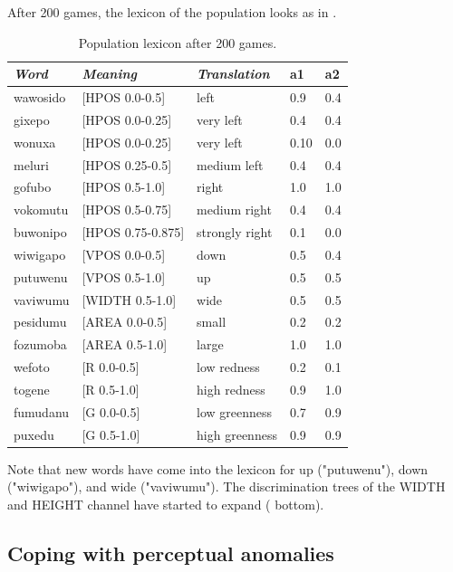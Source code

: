 After 200 games, the lexicon of the population looks as in . 
\begin{table}
\begin{center}
\begin{tabular}{| l | l | l | l | l |} \hline
{\it Word}&{\it Meaning}&{\it Translation} & {\bf a1}&{\bf a2} \\ \hline
wawosido & [HPOS 0.0-0.5] &left&0.9&0.4\\ \hline
gixepo & [HPOS 0.0-0.25] & very left&0.4&0.4\\ \hline
wonuxa & [HPOS 0.0-0.25] & very left&0.10&0.0\\ \hline
meluri & [HPOS 0.25-0.5] &medium left&0.4&0.4\\ \hline
gofubo & [HPOS 0.5-1.0]& right&1.0&1.0\\ \hline
vokomutu & [HPOS 0.5-0.75] &medium right&0.4&0.4\\ \hline
buwonipo & [HPOS 0.75-0.875] &strongly right&0.1&0.0\\ \hline
wiwigapo & [VPOS 0.0-0.5] &down&0.5&0.4\\ \hline
putuwenu & [VPOS 0.5-1.0]&up & 0.5&0.5\\ \hline
vaviwumu & [WIDTH 0.5-1.0]&wide & 0.5&0.5\\ \hline
pesidumu & [AREA 0.0-0.5]&small& 0.2&0.2\\ \hline
fozumoba & [AREA 0.5-1.0]&large & 1.0&1.0\\ \hline
wefoto & [R 0.0-0.5]& low redness &0.2&0.1\\ \hline
togene & [R 0.5-1.0]& high redness &0.9&1.0\\ \hline
fumudanu & [G 0.0-0.5]& low greenness &0.7&0.9\\ \hline
puxedu & [G 0.5-1.0]& high greenness &0.9&0.9\\ \hline
\end{tabular}
\caption{ \label{tab:upper} Population lexicon after 200 games.}
\end{center}
\end{table}
Note that new words have come into the lexicon 
for up ("putuwenu"), down ("wiwigapo"), and 
wide ("vaviwumu"). The discrimination trees of 
the WIDTH and HEIGHT channel have started to 
expand ( bottom). 

\subsection{Coping with perceptual anomalies}

